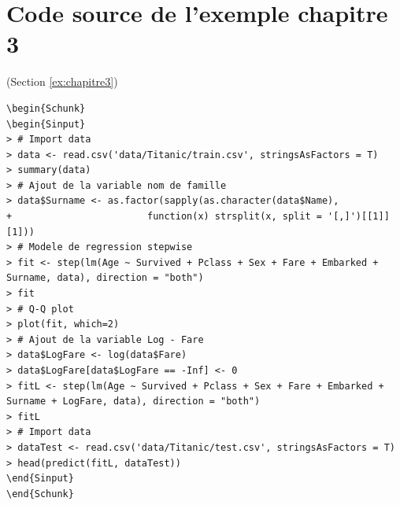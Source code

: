 \documentclass[11pt,french]{report}
\begin{document}
\newpage

\appendix

\chapter{Code source de l'exemple chapitre 3}
\label{codesour:chap3}
(Section \ref{ex:chapitre3})

\begin{lstlisting}[linerange=\\begin\{Sinput\}-\\end\{Sinput\},includerangemarker=false, caption = Code source en R pour l'exemple]
\begin{Schunk}
\begin{Sinput}
> # Import data
> data <- read.csv('data/Titanic/train.csv', stringsAsFactors = T)
> summary(data)
> # Ajout de la variable nom de famille
> data$Surname <- as.factor(sapply(as.character(data$Name),  
+                        function(x) strsplit(x, split = '[,]')[[1]][1]))
> # Modele de regression stepwise
> fit <- step(lm(Age ~ Survived + Pclass + Sex + Fare + Embarked + Surname, data), direction = "both")
> fit
> # Q-Q plot 
> plot(fit, which=2)
> # Ajout de la variable Log - Fare
> data$LogFare <- log(data$Fare)
> data$LogFare[data$LogFare == -Inf] <- 0
> fitL <- step(lm(Age ~ Survived + Pclass + Sex + Fare + Embarked + Surname + LogFare, data), direction = "both")
> fitL
> # Import data
> dataTest <- read.csv('data/Titanic/test.csv', stringsAsFactors = T)
> head(predict(fitL, dataTest))
\end{Sinput}
\end{Schunk}
\end{lstlisting}
\end{document}
